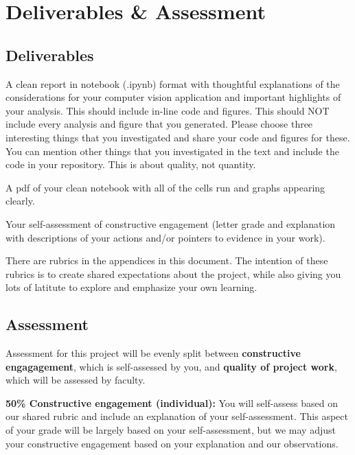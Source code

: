 \documentclass{tufte-handout}
\begin{document}
\section{Deliverables \& Assessment}

\subsection{Deliverables}
\be
\item A clean report in notebook (.ipynb) format with thoughtful explanations of the considerations for your computer vision application and important highlights of your analysis. This should include in-line code and figures.
This should NOT include every analysis and figure that you generated. Please choose three interesting things that you investigated and share your code and figures for these. You can mention other things that you investigated in the text and include the code in your repository. This is about quality, not quantity.

\item A pdf of your clean notebook with all of the cells run and graphs appearing clearly.

\item Your self-assessment of constructive engagement (letter grade and explanation with descriptions of your actions and/or pointers to evidence in your work). 
\ee

There are rubrics in the appendices in this document. The intention of these rubrics is to create shared expectations about the project, while also giving you lots of latitute to explore and emphasize your own learning.\\

\subsection{Assessment}

Assessment for this project will be evenly split between \textbf{constructive engagagement}, which is self-assessed by you, and \textbf{quality of project work}, which will be assessed by faculty.

\vspace{1em}

\textbf{50\% Constructive engagement (individual):} You will self-assess based on our shared rubric and include an explanation of your self-assessment. This aspect of your grade will be largely based on your self-assessment, but we may adjust your constructive engagement based on your explanation and our observations.\\
\vspace{1em}
\end{document}
